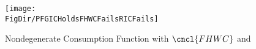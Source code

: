 \hypertarget{PFGICHoldsFHWCFailsRICFails}{}
\begin{figure}
\centerline{\texttt{[image: \\FigDir/PFGICHoldsFHWCFailsRICFails]}}
\caption{Nondegenerate Consumption Function with $\cncl{FHWC}$ and }
\label{fig:PFGICHoldsFHWCFailsRICFails}
\end{figure}
